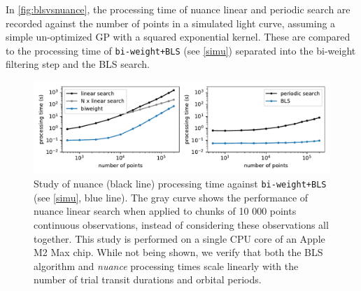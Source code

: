 \documentclass[modern,linenumbers]{aastex631}
\newcommand{\nuancemethod}{\textit{nuance}}
\newcommand{\nuancecode}{\textsf{nuance}}
\begin{document}
\noindent In \autoref{fig:blsvsnuance}, the processing time of \nuancecode{} linear and periodic search are recorded against the number of points in a simulated light curve, assuming a simple un-optimized GP with a squared exponential kernel. These are compared to the processing time of \texttt{bi-weight+BLS} (see \autoref{simu}) separated into the bi-weight filtering step and the BLS search.
\begin{figure}[H]
    \begin{centering}
        \includegraphics[width=\linewidth]{../workflows/benchmark/figures/nuance_vs_bls.pdf}
        \caption{Study of \textsf{nuance} (black line) processing time against \texttt{bi-weight+BLS} (see \autoref{simu}, blue line). The gray curve shows the performance of \textsf{nuance} linear search when applied to chunks of 10 000 points continuous observations, instead of considering these observations all together. This study is performed on a single CPU core of an Apple M2 Max chip. While not being shown, we verify that both the BLS algorithm and \nuancemethod{} processing times scale linearly with the number of trial transit durations and orbital periods.}
        \label{fig:blsvsnuance}
    \end{centering}
\end{figure}
\end{document}
